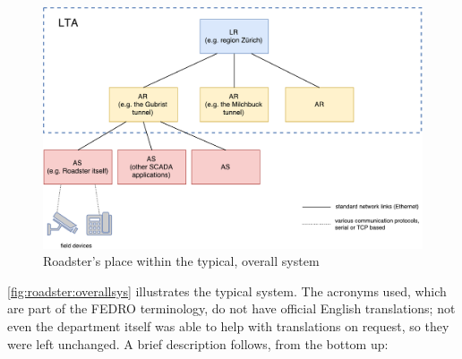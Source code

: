\begin{figure}[]
	\includegraphics[width=\textwidth]{img/overall_system.pdf}
	\caption{Roadster's place within the typical, overall system}
	\label{fig:roadster:overallsys}
\end{figure}

\autoref{fig:roadster:overallsys} illustrates the typical system. The acronyms
used, which are part of the \gls{FEDRO} terminology, do not have official
English translations; not even the department itself was able to help with
translations on request, so they were left unchanged. A brief description
follows, from the bottom up:

